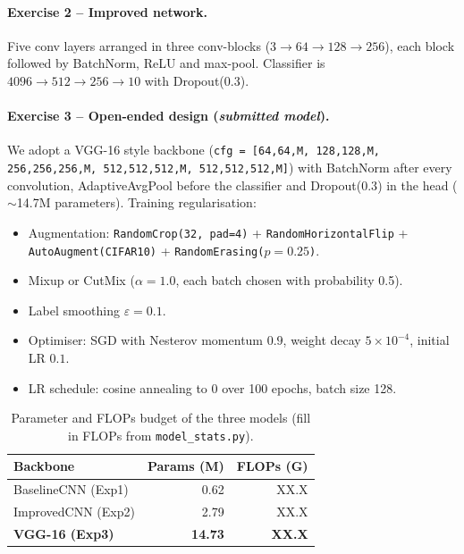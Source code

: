 \documentclass[10pt,conference]{article}
\begin{document}
\paragraph{Exercise 2 -- Improved network.}  Five conv layers arranged
in three conv-blocks ($3 \to 64 \to 128 \to 256$), each block
followed by BatchNorm, ReLU and max-pool.  Classifier is
$4096 \to 512 \to 256 \to 10$ with Dropout($0.3$).

\paragraph{Exercise 3 -- Open-ended design (\emph{submitted model}).}
We adopt a VGG-16 style backbone
(\texttt{cfg~=~[64,64,M, 128,128,M, 256,256,256,M, 512,512,512,M, 512,512,512,M]})
with BatchNorm after every convolution, AdaptiveAvgPool before the
classifier and Dropout($0.3$) in the head ($\sim$14.7M parameters).
Training regularisation:
\begin{itemize}\setlength\itemsep{0pt}
  \item Augmentation: \texttt{RandomCrop(32, pad=4)} +
        \texttt{RandomHorizontalFlip} + \texttt{AutoAugment(CIFAR10)} +
        \texttt{RandomErasing($p{=}0.25$)}.
  \item Mixup or CutMix ($\alpha{=}1.0$, each batch chosen with
        probability 0.5).
  \item Label smoothing $\varepsilon{=}0.1$.
  \item Optimiser: SGD with Nesterov momentum $0.9$, weight decay
        $5\!\times\!10^{-4}$, initial LR $0.1$.
  \item LR schedule: cosine annealing to 0 over 100 epochs,
        batch size 128.
\end{itemize}

\begin{table}[h]
\centering
\small
\begin{tabular}{l r r}
\toprule
\textbf{Backbone} & \textbf{Params (M)} & \textbf{FLOPs (G)} \\
\midrule
BaselineCNN (Exp1) &  0.62 &  XX.X \\
ImprovedCNN (Exp2) &  2.79 &  XX.X \\
\textbf{VGG-16 (Exp3)}  & \textbf{14.73} & \textbf{XX.X} \\
\bottomrule
\end{tabular}
\caption{Parameter and FLOPs budget of the three models (fill in FLOPs from \texttt{model\_stats.py}).}
\label{tab:params}
\end{table}
\end{document}
